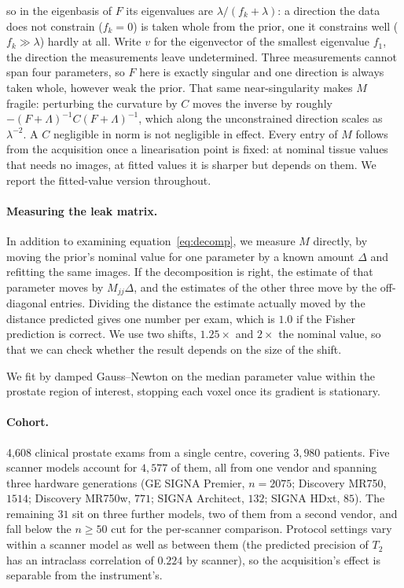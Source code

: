 \documentclass{article}
\begin{document}
so in the eigenbasis of $F$ its eigenvalues are $\lambda/(f_k+\lambda)$: a direction the data does not constrain ($f_k = 0$) is taken whole from the prior, one it
constrains well ($f_k \gg \lambda$) hardly at all. Write $v$ for the eigenvector of the smallest
eigenvalue $f_1$, the direction the measurements leave undetermined. Three measurements cannot span four parameters, so $F$ here is exactly singular and
one direction is always taken whole, however weak the prior. That same near-singularity makes $M$
fragile: perturbing the curvature by $C$ moves the inverse by roughly
$-(F+\Lambda)^{-1}C(F+\Lambda)^{-1}$, which along the unconstrained direction scales as
$\lambda^{-2}$. A $C$ negligible in norm is not negligible in effect. Every entry of $M$ follows from the acquisition once a linearisation point is fixed: at
nominal tissue values that needs no images, at fitted values it is sharper but depends on them. We
report the fitted-value version throughout.

\paragraph{Measuring the leak matrix.} In addition to examining equation~\ref{eq:decomp}, we
measure $M$ directly, by moving the prior's nominal value for one parameter by a known amount
$\Delta$ and refitting the same images. If the decomposition is right, the estimate of that parameter moves by
$M_{jj}\Delta$, and the estimates of the other three move by the off-diagonal entries. Dividing the
distance the estimate actually moved by the distance predicted gives one number per exam, which is
$1.0$ if the Fisher prediction is correct. We use two shifts, $1.25\times$ and $2\times$ the
nominal value, so that we can check whether the result depends on the size of the shift.

We fit by damped Gauss--Newton on the median parameter value within the prostate region of
interest, stopping each voxel once its gradient is stationary.

\paragraph{Cohort.} 4{,}608 clinical prostate exams from a single centre, covering $3{,}980$
patients. Five scanner models account for $4{,}577$ of them, all from one vendor and spanning three
hardware generations (GE SIGNA Premier, $n=2075$; Discovery MR750, $1514$; Discovery MR750w, $771$;
SIGNA Architect, $132$; SIGNA HDxt, $85$). The remaining $31$ sit on three further models, two of
them from a second vendor, and fall below the $n \geq 50$ cut for the per-scanner comparison. Protocol settings vary within a scanner model as well as between them (the
predicted precision of $T_2$ has an intraclass correlation of $0.224$ by scanner), so the
acquisition's effect is separable from the instrument's.
\end{document}

